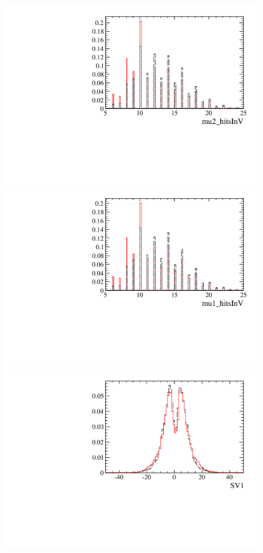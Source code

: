 \begin{figure} [htb!]
\begin{center}
\includegraphics[scale=0.20]{figs/mu2_hitsInVFULL.pdf}
\includegraphics[scale=0.20]{figs/mu1_hitsInVFULL.pdf}
\includegraphics[scale=0.20]{figs/SV1FULL.pdf}

\end{center}
\end{figure}
